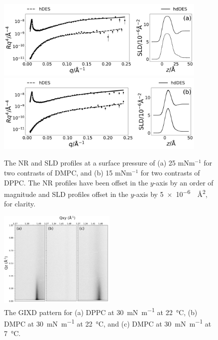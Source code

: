 \documentclass[amsmath,amssymb,superscriptaddress]{revtex4-1}
\begin{document}
\begin{figure}[H]
	\centering
	\includegraphics[width=0.9\textwidth]{figures/dmpc_25n_ref_sld}
	\includegraphics[width=0.9\textwidth]{figures/dppc_15n_ref_sld}
	\caption{The NR and SLD profiles at a surface pressure of (a) 25 mNm$^{-1}$ for two contrasts of DMPC, and (b) 15 mNm$^{-1}$ for two contrasts of DPPC. The NR profiles have been offset in the $y$-axis by an order of magnitude and SLD profiles offset in the $y$-axis by \SI{5e-6}{\per\square\angstrom}, for clarity.}
	\label{fig:neutron}
\end{figure}

\begin{figure}[H]
	\centering
	\includegraphics[width=0.50\textwidth]{figures/gixd}
	\caption{The GIXD pattern for (a) DPPC at \SI{30}{\milli\newton\per\meter} at \SI{22}{\celsius}, (b) DMPC at \SI{30}{\milli\newton\per\meter} at \SI{22}{\celsius}, and (c) DMPC at \SI{30}{\milli\newton\per\meter} at \SI{7}{\celsius}.}
	\label{fig:gixd}
\end{figure}
\end{document}

